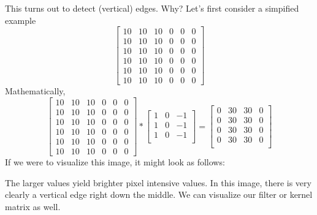 \documentclass[12pt]{article}
\begin{document}
This turns out to detect (vertical) edges. Why? Let's first consider a simpified example
\begin{equation*}   \begin{bmatrix}
 10 & 10 & 10 & 0 & 0 & 0 \\
 10 & 10 & 10 & 0 & 0 & 0 \\
 10 & 10 & 10 & 0 & 0 & 0 \\
 10 & 10 & 10 & 0 & 0 & 0 \\
 10 & 10 & 10 & 0 & 0 & 0 \\
 10 & 10 & 10 & 0 & 0 & 0
  \end{bmatrix} \end{equation*}
Mathematically,
\begin{equation*}   \begin{bmatrix}
 10 & 10 & 10 & 0 & 0 & 0 \\
 10 & 10 & 10 & 0 & 0 & 0 \\
 10 & 10 & 10 & 0 & 0 & 0 \\
 10 & 10 & 10 & 0 & 0 & 0 \\
 10 & 10 & 10 & 0 & 0 & 0 \\
 10 & 10 & 10 & 0 & 0 & 0
  \end{bmatrix} 
  * 
  \begin{bmatrix}     
    1 & 0 & -1 \\     
    1 & 0 & -1 \\
    1 & 0 & -1 \\
  \end{bmatrix}
  =
  \begin{bmatrix}     0 & 30 & 30 & 0 \\
    0 & 30 & 30 & 0 \\
    0 & 30 & 30 & 0 \\
    0 & 30 & 30 & 0 \\
  \end{bmatrix} \end{equation*}
If we were to visualize this image, it might look as follows:
\begin{figure}[h]   \centering
   \end{figure} The larger values yield brighter pixel intensive values. In this image, there is very clearly a vertical edge right down the middle.
We can visualize our filter or kernel matrix as well.
\begin{figure}[h]
  \centering
   \end{figure}
\end{document}

